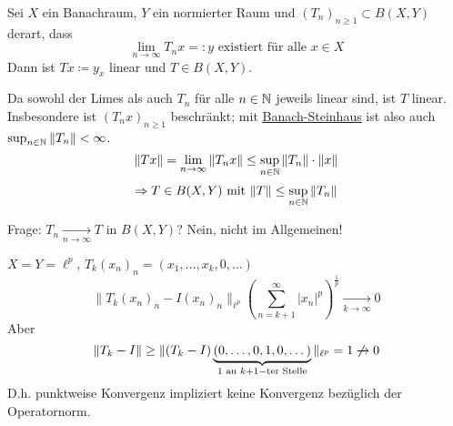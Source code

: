 \begin{kor} \label{kor:9.7}
	Sei $X$ ein Banachraum, $Y$ ein normierter Raum und $(T_{n})_{n \geq 1} \subset B(X, Y)$ derart, dass
	\[ \lim_{n \rightarrow \infty} T_{n} x =: y \text{ existiert für alle } x \in X \]
	Dann ist $T x \coloneqq y_{x}$ linear und $T \in B(X, Y)$.
	
	\newpage %
	
	\begin{beweis}
		Da sowohl der Limes als auch $T_{n}$ für alle $n \in \mathbb{N}$ jeweils linear sind, ist $T$  linear. \\
		Insbesondere ist $(T_{n} x)_{n \geq 1}$ beschränkt; mit \hyperref[satz:9.5-Banach-Steinhaus]{Banach-Steinhaus} ist also auch $ \sup_{n \in \mathbb{N}} \| T_{n} \| < \infty$. \\
		\[ \| T x \| = \lim_{n \rightarrow \infty} \| T_{n} x \| \leq \sup_{n \in \mathbb{N}} \|T_{n} \| \cdot \|x \| \]
		\[ \Rightarrow T \in B(X, Y) \text{ mit } \| T \| \leq \sup_{n \in \mathbb{N}} \| T_{n} \|\]
	\end{beweis}
	Frage: $T_{n} \xrightarrow[n \rightarrow \infty]{} T$ in $B(X, Y)$? Nein, nicht im Allgemeinen! \\
\end{kor} 

\begin{beispiel*}
	$X = Y = \ell^{p}$, $T_{k} (x_{n})_{n} = (x_{1}, \dotsc, x_{k}, 0, \dotsc)$
	\[ \| T_{k} (x_{n})_{n} - I (x_{n})_{n} \|_{\ell^{p}} \left( \sum_{n = k + 1}^{\infty} | x_{n} |^{p} \right)^{\frac{1}{p}} \xrightarrow[k \rightarrow \infty]{} 0 \]
	Aber
		\[ \| T_{k} - I \| \geq \|(T_{k} - I)\underbrace{(0, \dotsc, 0, 1, 0, \dotsc)	}_{1 \text{ an } k+1-\text{ter Stelle}} \|_{\ell^{p}} = 1 \not\xrightarrow[ ~ ]{ } 0 \]
	D.h. punktweise Konvergenz impliziert keine Konvergenz bezüglich der Operatornorm.
\end{beispiel*}



\newpage	